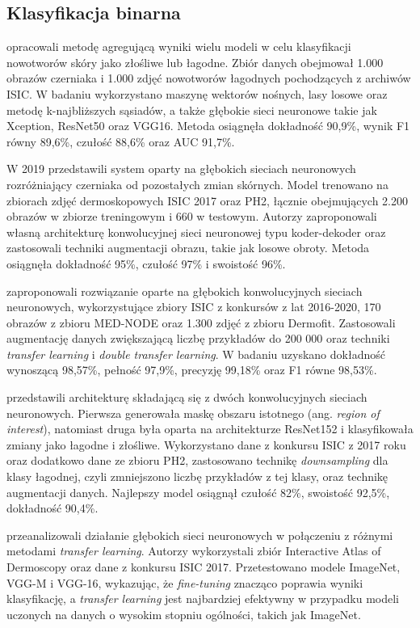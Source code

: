 \subsection{Klasyfikacja binarna}
\citet{diagnostics12102472} opracowali metodę agregującą wyniki wielu modeli w celu klasyfikacji nowotworów skóry jako złośliwe lub łagodne.
Zbiór danych obejmował 1.000 obrazów czerniaka i 1.000 zdjęć nowotworów łagodnych pochodzących z archiwów ISIC.
W badaniu wykorzystano maszynę wektorów nośnych, lasy losowe oraz metodę k-najbliższych sąsiadów, a także głębokie sieci neuronowe takie jak Xception, ResNet50 oraz VGG16.
Metoda osiągnęła dokładność 90,9\%, wynik F1 równy 89,6\%, czułość 88,6\% oraz AUC 91,7\%.

W 2019 \citet{Adegun_Viriri_2020} przedstawili system oparty na głębokich sieciach neuronowych rozróżniający czerniaka od pozostałych zmian skórnych.
Model trenowano na zbiorach zdjęć dermoskopowych ISIC 2017 oraz PH2, łącznie obejmujących 2.200 obrazów w zbiorze treningowym i 660 w testowym.
Autorzy zaproponowali własną architekturę konwolucyjnej sieci neuronowej typu koder-dekoder oraz zastosowali techniki augmentacji obrazu, takie jak losowe obroty.
Metoda osiągnęła dokładność 95\%, czułość 97\% i swoistość 96\%.

\citet{Alzubaidi_Al-Amidie_Al-Asadi_Humaidi_Al-Shamma_Fadhel_Zhang_Santamaría_Duan_2021} zaproponowali rozwiązanie oparte na głębokich konwolucyjnych sieciach neuronowych, wykorzystujące zbiory ISIC z konkursów z lat 2016-2020, 170 obrazów z zbioru MED-NODE oraz 1.300 zdjęć z zbioru Dermofit.
Zastosowali augmentację danych zwiększającą liczbę przykładów do 200 000 oraz techniki \textit{transfer learning} i \textit{double transfer learning}.
W badaniu uzyskano dokładność wynoszącą 98,57\%, pełność 97,9\%, precyzję 99,18\% oraz F1 równe 98,53\%.

\citet{Percybrooks_2021} przedstawili architekturę składającą się z dwóch konwolucyjnych sieciach neuronowych.
Pierwsza generowała maskę obszaru istotnego (ang. \textit{region of interest}), natomiast druga była oparta na architekturze ResNet152 i klasyfikowała zmiany jako łagodne i złośliwe.
Wykorzystano dane z konkursu ISIC z 2017 roku oraz dodatkowo dane ze zbioru PH2, zastosowano technikę \textit{downsampling} dla klasy łagodnej, czyli zmniejszono liczbę przykładów z tej klasy, oraz technikę augmentacji danych.
Najlepszy model osiągnął czułość 82\%, swoistość 92,5\%, dokładność 90,4\%.

\citet{Menegola_Fornaciali_Pires_Bittencourt_Avila_Valle_2017} przeanalizowali działanie głębokich sieci neuronowych w połączeniu z różnymi metodami \textit{transfer learning}.
Autorzy wykorzystali zbiór Interactive Atlas of Dermoscopy oraz dane z konkursu ISIC 2017.
Przetestowano modele ImageNet, VGG-M i VGG-16, wykazując, że \textit{fine-tuning} znacząco poprawia wyniki klasyfikację, a \textit{transfer learning} jest najbardziej efektywny w przypadku modeli uczonych na danych o wysokim stopniu ogólności, takich jak ImageNet.

